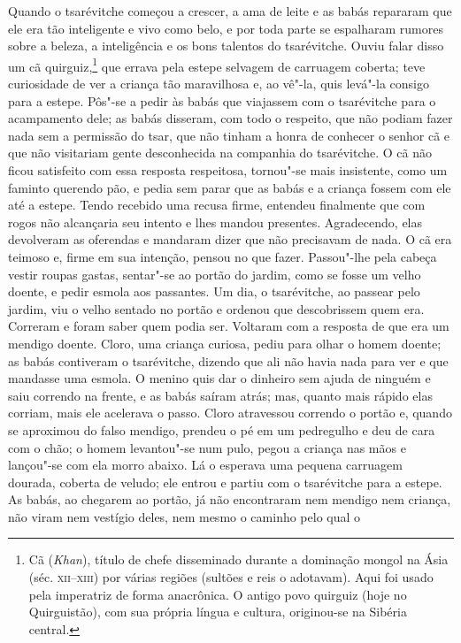 Quando o tsarévitche começou a crescer, a ama de leite e as babás
repararam que ele era tão inteligente e vivo como belo, e por toda parte
se espalharam rumores sobre a beleza, a inteligência e os bons talentos
do tsarévitche. Ouviu falar disso um cã quirguiz,\footnote{Cã (\emph{Khan}),
  título de chefe disseminado durante a dominação mongol na Ásia (séc.
  \textsc{xii--xiii}) por várias regiões (sultões e reis o adotavam). Aqui foi
  usado pela imperatriz de forma anacrônica. O antigo povo quirguiz (hoje no Quirguistão), com sua própria língua e cultura, originou-se na Sibéria central.} que errava
pela estepe selvagem de carruagem coberta; teve curiosidade de ver a
criança tão maravilhosa e, ao vê"-la, quis levá"-la consigo para a estepe.
Pôs"-se a pedir às babás que viajassem com o tsarévitche para o acampamento
dele; as babás disseram, com todo o respeito, que não podiam fazer nada
sem a permissão do tsar, que não tinham a honra de conhecer o senhor cã
e que não visitariam gente desconhecida na companhia do tsarévitche. O
cã não ficou satisfeito com essa resposta respeitosa, tornou"-se mais
insistente, como um faminto querendo pão, e pedia sem parar que as babás e
a criança fossem com ele até a estepe. Tendo recebido uma recusa firme,
entendeu finalmente que com rogos não alcançaria seu intento e lhes
mandou presentes. Agradecendo, elas devolveram as oferendas e mandaram
dizer que não precisavam de nada. O cã era teimoso e, firme em sua
intenção, pensou no que fazer. Passou"-lhe pela cabeça vestir roupas
gastas, sentar"-se ao portão do jardim, como se fosse um velho doente, e
pedir esmola aos passantes. Um dia, o tsarévitche, ao passear pelo
jardim, viu o velho sentado no portão e ordenou que descobrissem quem
era. Correram e foram saber quem podia ser. Voltaram com a resposta de
que era um mendigo doente. Cloro, uma criança curiosa, pediu para olhar
o homem doente; as babás contiveram o tsarévitche, dizendo que ali não
havia nada para ver e que mandasse uma esmola. O menino quis dar o
dinheiro sem ajuda de ninguém e saiu correndo na frente, e as babás
saíram atrás; mas, quanto mais rápido elas corriam, mais ele acelerava o
passo. Cloro atravessou correndo o portão e, quando se aproximou do
falso mendigo, prendeu o pé em um pedregulho e deu de cara com o chão; o
homem levantou"-se num pulo, pegou a criança nas mãos e lançou"-se com ela
morro abaixo. Lá o esperava uma pequena carruagem dourada, coberta de
veludo; ele entrou e partiu com o tsarévitche para a estepe. As
babás, ao chegarem ao portão, já não encontraram nem mendigo nem
criança, não viram nem vestígio deles, nem mesmo o caminho pelo qual o
